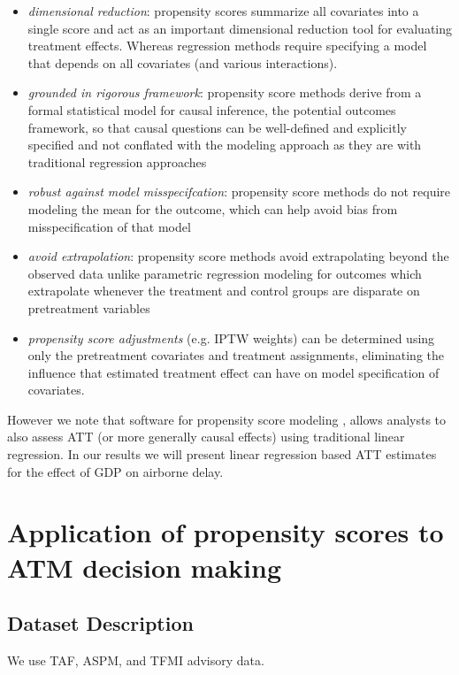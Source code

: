 \documentclass[11pt]{scrartcl}
\begin{document}
\begin{itemize}
\item \emph{dimensional reduction}: propensity scores summarize all covariates into a single score and act as an important dimensional reduction tool for evaluating treatment effects. Whereas regression methods require specifying a model that depends on all covariates (and various interactions).

\item  \emph{grounded in rigorous framework}: propensity score methods derive from a formal statistical model for causal inference, the potential outcomes framework, so that causal questions can be well-defined and explicitly specified and not conflated with the modeling approach as they are with traditional regression approaches

\item  \emph{robust against model misspecifcation}: propensity score methods do not require modeling the mean for the outcome, which can help avoid bias from misspecification of that model 

\item \emph{avoid extrapolation}: propensity score methods avoid extrapolating beyond the observed data unlike parametric regression modeling for outcomes which extrapolate whenever the treatment and control groups are disparate on pretreatment variables

\item \emph{propensity score adjustments} (e.g. IPTW weights) can be determined using only the pretreatment covariates and treatment assignments, eliminating the influence that estimated treatment effect can have on model specification of covariates.
\end{itemize}

However we note that software for propensity score modeling \cite{ridgeway2015toolkit}, allows analysts to also assess ATT (or more generally causal effects) using traditional linear regression.  In our results we will present linear regression based ATT estimates for the effect of GDP on airborne delay.  

\section*{Application of propensity scores to ATM decision making}

\subsection*{Dataset Description}
We use TAF, ASPM, and TFMI advisory data.  
\end{document}
